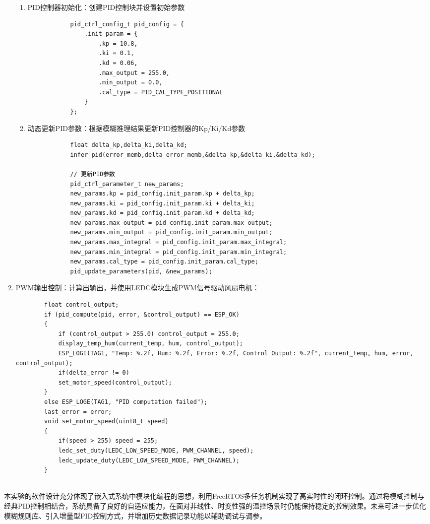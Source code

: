 \documentclass[UTF8]{ctexart}
\begin{document}
\begin{enumerate}
\begin{enumerate}
		\item PID控制器初始化：创建PID控制块并设置初始参数
		\begin{lstlisting}
			pid_ctrl_config_t pid_config = {
				.init_param = {
					.kp = 10.8,
					.ki = 0.1,
					.kd = 0.06,
					.max_output = 255.0,
					.min_output = 0.0,
					.cal_type = PID_CAL_TYPE_POSITIONAL
				}
			};
		\end{lstlisting}
		\item 动态更新PID参数：根据模糊推理结果更新PID控制器的Kp/Ki/Kd参数
		\begin{lstlisting}
			float delta_kp,delta_ki,delta_kd;
			infer_pid(error_memb,delta_error_memb,&delta_kp,&delta_ki,&delta_kd);
			
			// 更新PID参数
			pid_ctrl_parameter_t new_params;
			new_params.kp = pid_config.init_param.kp + delta_kp;
			new_params.ki = pid_config.init_param.ki + delta_ki;
			new_params.kd = pid_config.init_param.kd + delta_kd;
			new_params.max_output = pid_config.init_param.max_output;
			new_params.min_output = pid_config.init_param.min_output;
			new_params.max_integral = pid_config.init_param.max_integral;
			new_params.min_integral = pid_config.init_param.min_integral;
			new_params.cal_type = pid_config.init_param.cal_type;
			pid_update_parameters(pid, &new_params);
		\end{lstlisting}
	\end{enumerate}
	\item PWM输出控制：计算出输出，并使用LEDC模块生成PWM信号驱动风扇电机：
	\begin{lstlisting}
		float control_output;
		if (pid_compute(pid, error, &control_output) == ESP_OK)
		{
			if (control_output > 255.0) control_output = 255.0;
			display_temp_hum(current_temp, hum, control_output);
			ESP_LOGI(TAG1, "Temp: %.2f, Hum: %.2f, Error: %.2f, Control Output: %.2f", current_temp, hum, error, control_output);
			if(delta_error != 0)
			set_motor_speed(control_output);
		}
		else ESP_LOGE(TAG1, "PID computation failed");
		last_error = error;
		void set_motor_speed(uint8_t speed)
		{
			if(speed > 255) speed = 255;
			ledc_set_duty(LEDC_LOW_SPEED_MODE, PWM_CHANNEL, speed);
			ledc_update_duty(LEDC_LOW_SPEED_MODE, PWM_CHANNEL);
		}
		
	\end{lstlisting}
\end{enumerate}\par
本实验的软件设计充分体现了嵌入式系统中模块化编程的思想，利用FreeRTOS多任务机制实现了高实时性的闭环控制。通过将模糊控制与经典PID控制相结合，系统具备了良好的自适应能力，在面对非线性、时变性强的温控场景时仍能保持稳定的控制效果。未来可进一步优化模糊规则库、引入增量型PID控制方式，并增加历史数据记录功能以辅助调试与调参。
\end{document}
